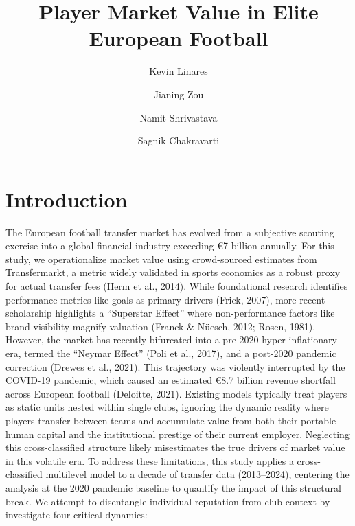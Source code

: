 \documentclass[
  12pt,
]{article}
\title{Player Market Value in Elite European Football}
\author{Kevin Linares \and Jianing Zou \and Namit
Shrivastava \and Sagnik Chakravarti}
\date{}
\begin{document}
\maketitle


\section{Introduction}\label{introduction}

The European football transfer market has evolved from a subjective
scouting exercise into a global financial industry exceeding €7 billion
annually. For this study, we operationalize market value using
crowd-sourced estimates from Transfermarkt, a metric widely validated in
sports economics as a robust proxy for actual transfer fees (Herm et
al., 2014). While foundational research identifies performance metrics
like goals as primary drivers (Frick, 2007), more recent scholarship
highlights a ``Superstar Effect'' where non-performance factors like
brand visibility magnify valuation (Franck \& Nüesch, 2012; Rosen,
1981). However, the market has recently bifurcated into a pre-2020
hyper-inflationary era, termed the ``Neymar Effect'' (Poli et al.,
2017), and a post-2020 pandemic correction (Drewes et al., 2021). This
trajectory was violently interrupted by the COVID-19 pandemic, which
caused an estimated €8.7 billion revenue shortfall across European
football (Deloitte, 2021). Existing models typically treat players as
static units nested within single clubs, ignoring the dynamic reality
where players transfer between teams and accumulate value from both
their portable human capital and the institutional prestige of their
current employer. Neglecting this cross-classified structure likely
misestimates the true drivers of market value in this volatile era. To
address these limitations, this study applies a cross-classified
multilevel model to a decade of transfer data (2013--2024), centering
the analysis at the 2020 pandemic baseline to quantify the impact of
this structural break. We attempt to disentangle individual reputation
from club context by investigate four critical dynamics:
\end{document}
